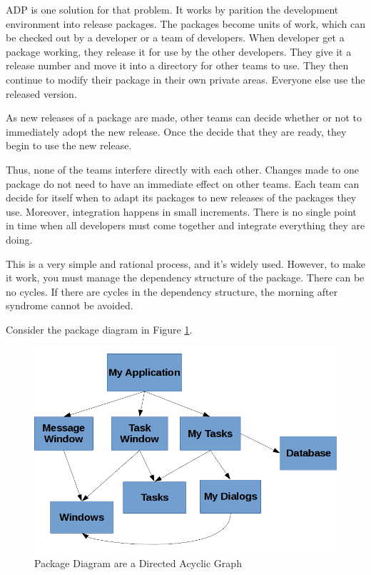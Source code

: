 \documentclass[12pt]{report}
\begin{document}
ADP is one solution for that problem.
It works by parition the development environment into release packages.
The packages become units of work, 
which can be checked out by a developer or a team of developers.
When developer get a package working, 
they release it for use by the other developers.
They give it a release number and move it 
into a directory for other teams to use.
They then continue to modify their package in their own private areas. 
Everyone else use the released version.

As new releases of a package are made, other teams can decide whether or not to immediately adopt the new release.
Once the decide that they are ready, they begin to use the new release.

Thus, none of the teams interfere directly with each other. 
Changes made to one package do not need to have an
immediate effect on other teams. 
Each team can decide for itself 
when to adapt its packages to new releases of the packages they use. 
Moreover, integration happens in small increments. 
There is no single point in time when all
developers must come together and integrate everything they are doing.

This is a very simple and rational process, and it's widely used.
However, to make it work, you must manage the dependency structure 
of the package. There can be no cycles. If there are cycles in the 
dependency structure, the morning after syndrome cannot be avoided.

Consider the package diagram in Figure \ref{DAG}.

\begin{figure}[H]
    \centering
    \includegraphics[width=\textwidth]{uml/DAG.png}
    \caption{Package Diagram are a Directed Acyclic Graph}
    \label{DAG}
\end{figure}
\end{document}
